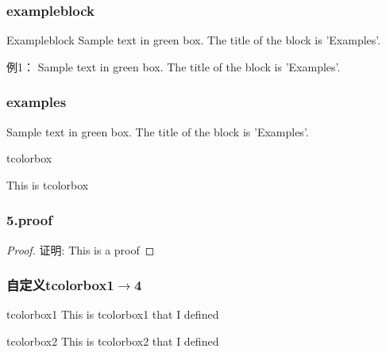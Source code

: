 \begin{frame}
    \frametitle{exampleblock}
	\begin{exampleblock} {Exampleblock}
		Sample text in green box. The title of the block is 'Examples'.
	\end{exampleblock}
    \begin{exampleblock} {例1：}
		Sample text in green box. The title of the block is 'Examples'.
	\end{exampleblock}
\end{frame}

\begin{frame}
    \frametitle{examples}
	\begin{examples}
		Sample text in green box. The title of the block is 'Examples'.
	\end{examples}
\end{frame}

\begin{frame}{tcolorbox}
  \begin{tcolorbox}[title=5.tcolorbox,colframe=red!75!black]
    This is tcolorbox
  \end{tcolorbox}
\end{frame}

\begin{frame}
    \frametitle{5.proof}
    \begin{proof}{证明:}
      {This is a proof}
    \end{proof}
\end{frame}

\begin{frame}
    \frametitle{自定义tcolorbox1$\to$4}
    \begin{tcolorbox1}[0.8]{tcolorbox1}
      This is tcolorbox1 that I defined
    \end{tcolorbox1}
    \begin{tcolorbox2}[0.86]{tcolorbox2}
      This is tcolorbox2 that I defined
    \end{tcolorbox2}
\end{frame}
\begin{frame}
  \frametitle{}
  \begin{tcolorbox3}[量子力学基本假设1/5]
    \lipsum[4]
  \end{tcolorbox3}
\end{frame}

\begin{frame}
    \begin{tcolorbox4}[量子力学基本假设1/5]
    \lipsum[4]
    \end{tcolorbox4}
\end{frame}

